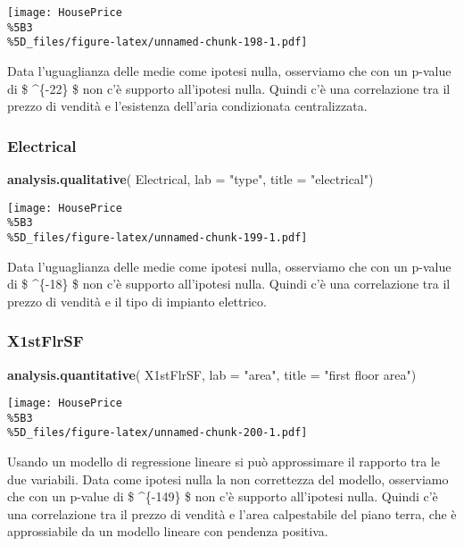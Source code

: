 \documentclass[
]{article}
\newenvironment{Shaded}{\begin{snugshade}}{\end{snugshade}}
\newcommand{\AttributeTok}[1]{\textcolor[rgb]{0.13,0.29,0.53}{#1}}
\newcommand{\FunctionTok}[1]{\textcolor[rgb]{0.13,0.29,0.53}{\textbf{#1}}}
\newcommand{\NormalTok}[1]{#1}
\newcommand{\StringTok}[1]{\textcolor[rgb]{0.31,0.60,0.02}{#1}}
\begin{document}
\texttt{[image: HousePrice\\\%5B3\\\%5D\_files/figure-latex/unnamed-chunk-198-1.pdf]}

Data l'uguaglianza delle medie come ipotesi nulla, osserviamo che con un
p-value di \$ \^{}\{-22\} \$ non c'è supporto all'ipotesi
nulla. Quindi c'è una correlazione tra il prezzo di vendità e
l'esistenza dell'aria condizionata centralizzata.

\subsubsection{Electrical}\label{electrical-1}

\begin{Shaded}
\begin{Highlighting}[]
\FunctionTok{analysis.qualitative}\NormalTok{(}
\NormalTok{    Electrical,}
    \AttributeTok{lab =} \StringTok{"type"}\NormalTok{,}
    \AttributeTok{title =} \StringTok{"electrical"}\NormalTok{)}
\end{Highlighting}
\end{Shaded}

\texttt{[image: HousePrice\\\%5B3\\\%5D\_files/figure-latex/unnamed-chunk-199-1.pdf]}

Data l'uguaglianza delle medie come ipotesi nulla, osserviamo che con un
p-value di \$ \^{}\{-18\} \$ non c'è supporto all'ipotesi
nulla. Quindi c'è una correlazione tra il prezzo di vendità e il tipo di
impianto elettrico.

\subsubsection{X1stFlrSF}\label{x1stflrsf-1}

\begin{Shaded}
\begin{Highlighting}[]
\FunctionTok{analysis.quantitative}\NormalTok{(}
\NormalTok{    X1stFlrSF,}
    \AttributeTok{lab =} \StringTok{"area"}\NormalTok{,}
    \AttributeTok{title =} \StringTok{"first floor area"}\NormalTok{)}
\end{Highlighting}
\end{Shaded}

\texttt{[image: HousePrice\\\%5B3\\\%5D\_files/figure-latex/unnamed-chunk-200-1.pdf]}

Usando un modello di regressione lineare si può approssimare il rapporto
tra le due variabili. Data come ipotesi nulla la non correttezza del
modello, osserviamo che con un p-value di \$ \^{}\{-149\} \$
non c'è supporto all'ipotesi nulla. Quindi c'è una correlazione tra il
prezzo di vendità e l'area calpestabile del piano terra, che è
approssiabile da un modello lineare con pendenza positiva.
\end{document}
